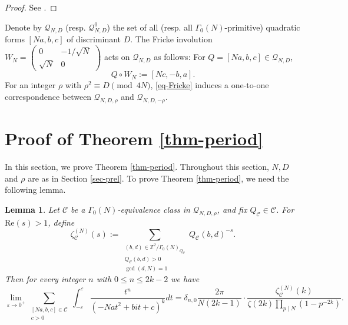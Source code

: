 \documentclass[12pt]{amsart}
\numberwithin{equation}{section}
\newtheorem{lemma}[theorem]{Lemma}
\theoremstyle{definition}
\begin{document}
\begin{proof}
    See \cite[pp. 505--506]{GKZ87}.
\end{proof}

Denote by $\mathcal{Q}_{N,D}$ (resp. $\mathcal{Q}_{N,D}^{0}$) the set of all (resp. all $\Gamma_{0}(N)$-primitive) quadratic forms $[Na,b,c]$ of discriminant $D$.
The Fricke involution $W_{N}=\left(\begin{smallmatrix}
    0 & -1/\sqrt{N} \\ \sqrt{N} & 0
\end{smallmatrix}\right)$ acts on $\mathcal{Q}_{N,D}$ as follows: For $Q=[Na,b,c]\in\mathcal{Q}_{N,D}$,
\begin{equation}\label{eq-Fricke}
    Q\circ W_{N}:=[Nc,-b,a].
\end{equation}
For an integer $\rho$ with $\rho^{2}\equiv D\pmod{4N}$, \eqref{eq-Fricke} induces a one-to-one correspondence between $\mathcal{Q}_{N,D,\rho}$ and $\mathcal{Q}_{N,D,-\rho}$.

\section{Proof of Theorem \ref{thm-period}}\label{sec-period}

In this section, we prove Theorem \ref{thm-period}. Throughout this section, $N,D$ and $\rho$ are as in Section \ref{sec-prel}. To prove Theorem \ref{thm-period}, we need the following lemma.

\begin{lemma}\label{lem-limit}
    Let $\mathcal{C}$ be a $\Gamma_{0}(N)$-equivalence class in $\mathcal{Q}_{N,D,\rho}$, and fix $Q_{\mathcal{C}}\in\mathcal{C}$.
    For $\mathrm{Re}(s)>1$, define
    \begin{equation}\label{eq-classzeta}
        \zeta_{\mathcal{C}}^{(N)}(s):=\sum\limits_{\substack{(b,d)\in\mathbb{Z}^{2}/\Gamma_{0}(N)_{Q_{\mathcal{C}}} \\ Q_{\mathcal{C}}(b,d)>0 \\ \gcd(d,N)=1}}Q_{\mathcal{C}}(b,d)^{-s}.
    \end{equation}
    Then for every integer $n$ with $0\leq n\leq 2k-2$ we have
    \begin{equation}\label{eq-limitvalue}
        \lim_{\varepsilon\rightarrow 0^{+}}\sum_{\substack{[Na,b,c]\in \mathcal{C} \\ c>0}}\int_{-\varepsilon}^{\varepsilon}\frac{t^{n}}{(-Nat^{2}+bit+c)^{k}}dt=\delta_{n,0}\frac{2\pi}{N(2k-1)}\cdot\frac{\zeta_{\mathcal{C}}^{(N)}(k)}{\zeta(2k)\prod_{p\mid N}(1-p^{-2k})}.
\end{equation}
\end{lemma}
\end{document}
